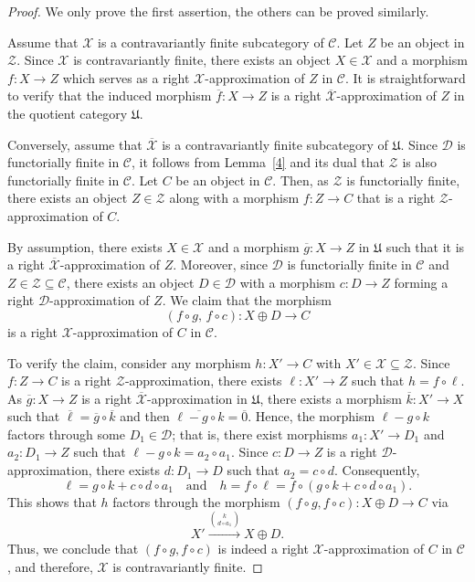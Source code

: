 \documentclass[a4paper,reqno,11pt]{amsart}
\theoremstyle{definition}
\def\C{\mathcal{C}}
\def\D{\mathcal{D}}
\def\X{\mathcal{X}}
\def\D{\mathcal{D}}
\def\Z{\mathcal {Z}}
\def \text{\mbox}
\begin{document}
\begin{proof}
We only prove the first assertion, the others can be proved similarly.

Assume that $\X$ is a contravariantly finite subcategory of $\C$. Let $Z$ be an object in $\Z$. Since $\X$ is contravariantly finite, there exists an object $X \in \X$ and a morphism $f \colon X \to Z$ which serves as a right $\X$-approximation of $Z$ in $\C$. It is straightforward to verify that the induced morphism $\overline{f} \colon X \to Z$ is a right $\overline{\X}$-approximation of $Z$ in the quotient category $\mathfrak{U}$.

Conversely, assume that $\overline{\X}$ is a contravariantly finite subcategory of $\mathfrak{U}$. Since $\D$ is functorially finite in $\C$, it follows from Lemma~\ref{4} and its dual that $\Z$ is also functorially finite in $\C$. Let $C$ be an object in $\C$. Then, as $\Z$ is functorially finite, there exists an object $Z \in \Z$ along with a morphism $f \colon Z \to C$ that is a right $\Z$-approximation of $C$.

By assumption, there exists $X \in \X$ and a morphism $\overline{g} \colon X \to Z$ in $\mathfrak{U}$ such that it is a right $\overline{\X}$-approximation of $Z$. Moreover, since $\D$ is functorially finite in $\C$ and $Z \in \Z \subseteq \C$, there exists an object $D \in \D$ with a morphism $c \colon D \to Z$ forming a right $\D$-approximation of $Z$. We claim that the morphism
\[
(f \circ g,\, f \circ c) \colon X \oplus D \to C
\]
is a right $\X$-approximation of $C$ in $\C$.

To verify the claim, consider any morphism $h \colon X' \to C$ with $X' \in \X \subseteq \Z$. Since $f \colon Z \to C$ is a right $\Z$-approximation, there exists $\ell \colon X' \to Z$ such that $h = f \circ \ell$. As $\overline{g} \colon X \to Z$ is a right $\overline{\X}$-approximation in $\mathfrak{U}$, there exists a morphism $\overline{k} \colon X' \to X$ such that $\overline{\ell} = \overline{g} \circ \overline{k}$ and then
$
\overline{\ell - g \circ k} = \overline{0}.
$
Hence, the morphism $\ell - g \circ k$ factors through some $D_1 \in \D$; that is, there exist morphisms $a_1 \colon X' \to D_1$ and $a_2 \colon D_1 \to Z$ such that $\ell - g \circ k = a_2 \circ a_1$. Since $c \colon D \to Z$ is a right $\D$-approximation, there exists $d \colon D_1 \to D$ such that $a_2 = c \circ d$. Consequently,
\[
\ell = g \circ k + c \circ d \circ a_1 \quad \text{and} \quad h = f \circ \ell = f \circ (g \circ k + c \circ d \circ a_1).
\]
This shows that $h$ factors through the morphism $(f \circ g, f \circ c) \colon X \oplus D \to C$ via
\[
X' \xrightarrow{\binom{k}{d \circ a_1}} X \oplus D.
\]
Thus, we conclude that $(f \circ g, f \circ c)$ is indeed a right $\X$-approximation of $C$ in $\C$, and therefore, $\X$ is contravariantly finite.
\end{proof}
\end{document}
